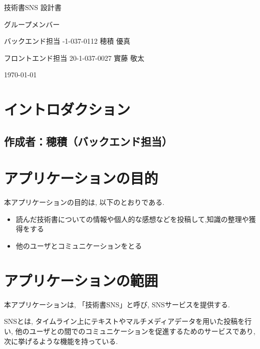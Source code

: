 \documentclass[dvipdfmx]{jsarticle}
\begin{document}
    \begin{titlepage}
        \begin{center}
            \vspace*{180truept}
            {\Huge 技術書SNS 設計書}

            \vspace{160truept}
            {\Large グループメンバー}

            \vspace{20truept}
            {\Large バックエンド担当 -1-037-0112 穂積 優真}

            \vspace{10truept}
            {\Large フロントエンド担当 20-1-037-0027 實藤 敬太}
            {\Large }

            \vspace{160truept}
            \today
        \end{center}
    \end{titlepage}
    \newpage

    \section*{イントロダクション}
    \subsection*{\rm{作成者：穂積（バックエンド担当）}}
    \section{アプリケーションの目的}
    本アプリケーションの目的は, 以下のとおりである.
    \begin{itemize}
        \item 読んだ技術書についての情報や個人的な感想などを投稿して,知識の整理や獲得をする
        \item 他のユーザとコミュニケーションをとる
    \end{itemize}

    \section{アプリケーションの範囲}
    本アプリケーションは, 「技術書SNS」と呼び, SNSサービスを提供する.

    SNSとは, タイムライン上にテキストやマルチメディアデータを用いた投稿を行い, 他のユーザとの間でのコミュニケーションを促進するためのサービスであり, 次に挙げるような機能を持っている.
\end{document}
